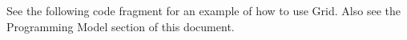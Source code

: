 

See the following code fragment for an example of
how to use Grid.  Also see
the Programming Model section of this document.



